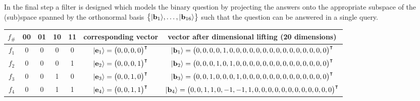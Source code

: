 \documentclass{ws-procs9x6}
\begin{document}
In the final step a filter is designed which models the binary question by projecting the answers onto the appropriate subspace of the (sub)space spanned by the orthonormal
basis $\big\{ \vert {\bf b}_1 \rangle , \ldots ,  \vert  {\bf b}_{16}   \rangle   \big\}$
such that the question can be answered in a single query.


\begin{sidewaystable}
\vspace*{+250pt}
{\normalsize
\begin{tabular}{ccccccc}
\toprule
$f_\#$ &00&01&10&11 & corresponding vector & vector after dimensional lifting (20 dimensions) \\
\midrule
$f_1   $&0  &  0 &   0 &   0  & $\vert {\bf e}_1    \rangle=\begin{pmatrix} 0  ,  0 ,   0 ,   0  \end{pmatrix}^\intercal$&{\scriptsize$\vert {\bf b}_1    \rangle=\begin{pmatrix}0 , 0 , 0 , 0 , 1 , 0 , 0 , 0 , 0 , 0 , 0 , 0 , 0 , 0 , 0 , 0 , 0 , 0 , 0 , 0 \end{pmatrix}^\intercal                                           $}\\
$f_2   $&0  &  0 &   0 &   1  & $\vert {\bf e}_2    \rangle=\begin{pmatrix} 0  ,  0 ,   0 ,   1  \end{pmatrix}^\intercal$&{\scriptsize$\vert {\bf b}_2    \rangle=\begin{pmatrix}0 , 0 , 0 , 1 , 0 , 1 , 0 , 0 , 0 , 0 , 0 , 0 , 0 , 0 , 0 , 0 , 0 , 0 , 0 , 0 \end{pmatrix}^\intercal                                           $}\\
$f_3   $&0  &  0 &   1 &   0  & $\vert {\bf e}_3    \rangle=\begin{pmatrix} 0  ,  0 ,   1 ,   0  \end{pmatrix}^\intercal$&{\scriptsize$\vert {\bf b}_3    \rangle=\begin{pmatrix}0 , 0 , 1 , 0 , 0 , 0 , 1 , 0 , 0 , 0 , 0 , 0 , 0 , 0 , 0 , 0 , 0 , 0 , 0 , 0 \end{pmatrix}^\intercal                                           $}\\
$f_4   $&0  &  0 &   1 &   1  & $\vert {\bf e}_4    \rangle=\begin{pmatrix} 0  ,  0 ,   1 ,   1  \end{pmatrix}^\intercal$&{\scriptsize$\vert {\bf b}_4    \rangle=\begin{pmatrix}0 , 0 , 1 , 1 , 0 , -1 , -1 , 1 , 0 , 0 , 0 , 0 , 0 , 0 , 0 , 0 , 0 , 0 , 0 , 0 \end{pmatrix}^\intercal                                         $}\\

\end{tabular}}
\end{sidewaystable}
\end{document}

